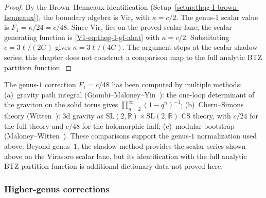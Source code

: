 \begin{proof}
By the Brown--Henneaux identification
(Setup~\ref{setup:thqg-I-brown-henneaux}), the boundary algebra is
$\mathrm{Vir}_c$ with $\kappa = c/2$. The genus-$1$ scalar value is
$F_1 = \kappa/24 = c/48$. Since $\mathrm{Vir}_c$ lies on the proved
scalar lane, the scalar generating function is
\eqref{V1-eq:thqg-I-gf-ahat} with $\kappa = c/2$. Substituting
$c = 3\ell/(2G)$ gives $\kappa = 3\ell/(4G)$. The argument stops at the
scalar shadow series; this chapter does not construct a comparison map
to the full analytic BTZ partition function.
\end{proof}

\begin{remark}
The genus-$1$ correction $F_1 = c/48$ has been computed by multiple
methods: (a)~gravity path integral (Giombi--Maloney--Yin~\cite{GMY08}):
the one-loop determinant of the graviton on the solid torus gives
$\prod_{n=2}^{\infty} (1 - q^n)^{-1}$; (b)~Chern--Simons theory
(Witten~\cite{Witten88}): 3d gravity as
$\mathrm{SL}(2,\mathbb{R}) \times \mathrm{SL}(2,\mathbb{R})$ CS theory,
with $c/24$ for the full theory and $c/48$ for the holomorphic half;
(c)~modular bootstrap (Maloney--Witten~\cite{MW10}). These comparisons
support the genus-$1$ normalization used above. Beyond genus~$1$, the
shadow method provides the scalar series shown above on the Virasoro
scalar lane, but its identification with the full analytic BTZ
partition function is additional dictionary data not proved here.
\end{remark}

\subsubsection{Higher-genus corrections}

